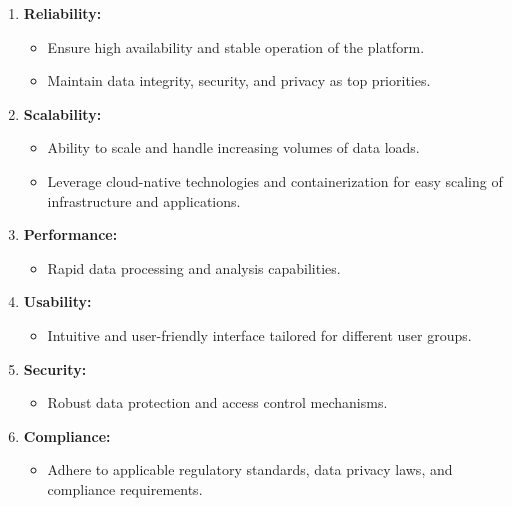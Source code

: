 \begin{enumerate}[resume]
  \item \textbf{Reliability:}
  \begin{itemize}[label=--,leftmargin=*,parsep=0pt]
      \item Ensure high availability and stable operation of the platform.
      \item Maintain data integrity, security, and privacy as top priorities.
  \end{itemize}
  
  \item \textbf{Scalability:}
  \begin{itemize}[label=--,leftmargin=*,parsep=0pt]
      \item Ability to scale and handle increasing volumes of data loads.
      \item Leverage cloud-native technologies and containerization for easy
      scaling of infrastructure and applications.
  \end{itemize}
  
  \item \textbf{Performance:}
  \begin{itemize}[label=--,leftmargin=*,parsep=0pt]
      \item Rapid data processing and analysis capabilities.
  \end{itemize}
  
  \item \textbf{Usability:}
  \begin{itemize}[label=--,leftmargin=*,parsep=0pt]
      \item Intuitive and user-friendly interface tailored for different user
      groups.
  \end{itemize}
  
  \item \textbf{Security:}
  \begin{itemize}[label=--,leftmargin=*,parsep=0pt]
      \item Robust data protection and access control mechanisms.
  \end{itemize}
  
  \item \textbf{Compliance:}
  \begin{itemize}[label=--,leftmargin=*,parsep=0pt]
      \item Adhere to applicable regulatory standards, data privacy laws, and
      compliance requirements.
  \end{itemize}
  

\end{enumerate}
